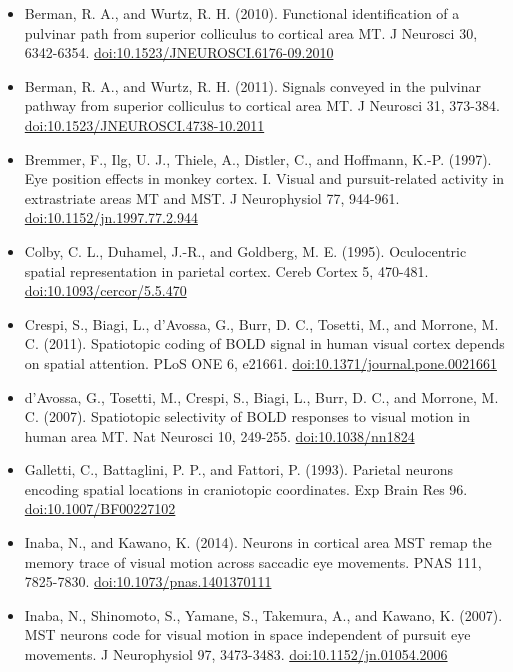 \documentclass[11pt,a4paper]{article}
\begin{document}
\begin{itemize}[itemsep=2pt,topsep=2pt]
\item Berman, R. A., and Wurtz, R. H. (2010). Functional identification of a pulvinar path from superior colliculus to cortical area MT. J Neurosci 30, 6342-6354. \href{https://doi.org/10.1523/JNEUROSCI.6176-09.2010}{doi:10.1523/JNEUROSCI.6176-09.2010}
\item Berman, R. A., and Wurtz, R. H. (2011). Signals conveyed in the pulvinar pathway from superior colliculus to cortical area MT. J Neurosci 31, 373-384. \href{https://doi.org/10.1523/JNEUROSCI.4738-10.2011}{doi:10.1523/JNEUROSCI.4738-10.2011}
\item Bremmer, F., Ilg, U. J., Thiele, A., Distler, C., and Hoffmann, K.-P. (1997). Eye position effects in monkey cortex. I. Visual and pursuit-related activity in extrastriate areas MT and MST. J Neurophysiol 77, 944-961. \href{https://doi.org/10.1152/jn.1997.77.2.944}{doi:10.1152/jn.1997.77.2.944}
\item Colby, C. L., Duhamel, J.-R., and Goldberg, M. E. (1995). Oculocentric spatial representation in parietal cortex. Cereb Cortex 5, 470-481. \href{https://doi.org/10.1093/cercor/5.5.470}{doi:10.1093/cercor/5.5.470}
\item Crespi, S., Biagi, L., d'Avossa, G., Burr, D. C., Tosetti, M., and Morrone, M. C. (2011). Spatiotopic coding of BOLD signal in human visual cortex depends on spatial attention. PLoS ONE 6, e21661. \href{https://doi.org/10.1371/journal.pone.0021661}{doi:10.1371/journal.pone.0021661}
\item d'Avossa, G., Tosetti, M., Crespi, S., Biagi, L., Burr, D. C., and Morrone, M. C. (2007). Spatiotopic selectivity of BOLD responses to visual motion in human area MT. Nat Neurosci 10, 249-255. \href{https://doi.org/10.1038/nn1824}{doi:10.1038/nn1824}
\item Galletti, C., Battaglini, P. P., and Fattori, P. (1993). Parietal neurons encoding spatial locations in craniotopic coordinates. Exp Brain Res 96. \href{https://doi.org/10.1007/BF00227102}{doi:10.1007/BF00227102}
\item Inaba, N., and Kawano, K. (2014). Neurons in cortical area MST remap the memory trace of visual motion across saccadic eye movements. PNAS 111, 7825-7830. \href{https://doi.org/10.1073/pnas.1401370111}{doi:10.1073/pnas.1401370111}
\item Inaba, N., Shinomoto, S., Yamane, S., Takemura, A., and Kawano, K. (2007). MST neurons code for visual motion in space independent of pursuit eye movements. J Neurophysiol 97, 3473-3483. \href{https://doi.org/10.1152/jn.01054.2006}{doi:10.1152/jn.01054.2006}

\end{itemize}
\end{document}
